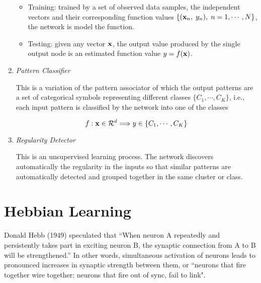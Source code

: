 \documentclass{article}
\begin{document}
\begin{enumerate}
  \begin{itemize}
  \item Training: trained by a set of observed data samples, the independent
    vectors and their corresponding function values $\{ ({\bf x}_n,\;y_n),\;
    n=1,\cdots,N\}$, the network is model the function.

  \item Testing: given any vector ${\bf x}$, the output value produced 
    by the single output node is an estimated function value $y=f({\bf x})$.

  \end{itemize}

\item {\em Pattern Classifier}

  This is a variation of the pattern associator of which the output 
  patterns are a set of categorical symbols representing different 
  classes $\{C_1,\cdots,C_K\}$, i.e., each input pattern is classified
  by the network into one of the classes

  \begin{equation}
    f: {\bf x} \in {\cal R}^d \Longrightarrow y \in \{C_1,\cdots,C_K\}
  \end{equation}


\item {\em Regularity Detector}	

  This is an unsupervised learning process. The network discovers 
  automatically the regularity in the inputs so that similar patterns
  are automatically detected and grouped together in the same cluster
  or class.	

\end{enumerate}


\section{Hebbian Learning}

Donald Hebb (1949) speculated that ``When neuron A repeatedly and 
persistently takes part in exciting neuron B, the synaptic connection 
from A to B will be strengthened.'' In other words, simultaneous 
activation of neurons leads to pronounced increases in synaptic 
strength between them, or ``neurons that fire together wire together; 
neurons that fire out of sync, fail to link". 
\end{document}
